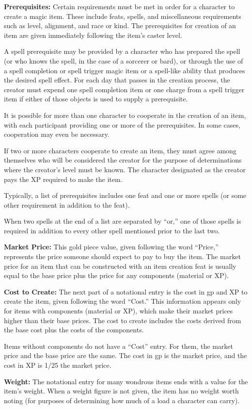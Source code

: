 \textbf{Prerequisites:} Certain requirements must be met in order for a character to create a magic item. These include feats, spells, and miscellaneous requirements such as level, alignment, and race or kind. The prerequisites for creation of an item are given immediately following the item's caster level.

A spell prerequisite may be provided by a character who has prepared the spell (or who knows the spell, in the case of a sorcerer or bard), or through the use of a spell completion or spell trigger magic item or a spell-like ability that produces the desired spell effect. For each day that passes in the creation process, the creator must expend one spell completion item or one charge from a spell trigger item if either of those objects is used to supply a prerequisite.

It is possible for more than one character to cooperate in the creation of an item, with each participant providing one or more of the prerequisites. In some cases, cooperation may even be necessary.

If two or more characters cooperate to create an item, they must agree among themselves who will be considered the creator for the purpose of determinations where the creator's level must be known. The character designated as the creator pays the XP required to make the item.

Typically, a list of prerequisites includes one feat and one or more spells (or some other requirement in addition to the feat).

When two spells at the end of a list are separated by ``or,'' one of those spells is required in addition to every other spell mentioned prior to the last two.

\textbf{Market Price:} This gold piece value, given following the word ``Price,'' represents the price someone should expect to pay to buy the item. The market price for an item that can be constructed with an item creation feat is usually equal to the base price plus the price for any components (material or XP).

\textbf{Cost to Create:} The next part of a notational entry is the cost in gp and XP to create the item, given following the word ``Cost.'' This information appears only for items with components (material or XP), which make their market prices higher than their base prices. The cost to create includes the costs derived from the base cost plus the costs of the components.

Items without components do not have a ``Cost'' entry. For them, the market price and the base price are the same. The cost in gp is \onehalf the market price, and the cost in XP is 1/25 the market price.

\textbf{Weight:} The notational entry for many wondrous items ends with a value for the item's weight. When a weight figure is not given, the item has no weight worth noting (for purposes of determining how much of a load a character can carry). 